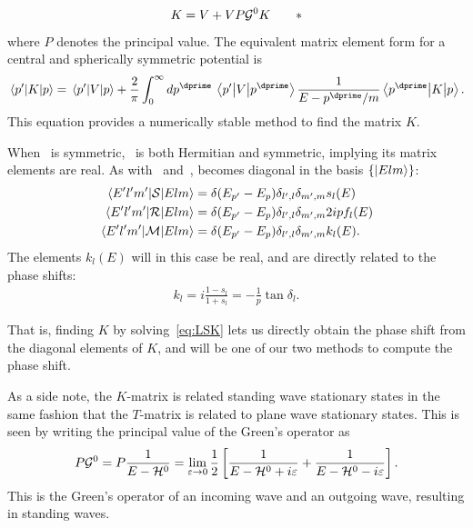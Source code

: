 \begin{equation*}
  K = V + VP\mathcal{G}^{0}K
  \tag*{$*$}
\end{equation*}
where \(P\) denotes the principal value. The equivalent matrix element form for
a central and spherically symmetric potential is\cite{morten}
\begin{equation}
  \label{eq:LSK}
  \mel{p^{\prime}}{K}{p} = \mel{p^{\prime}}{V}{p} + \frac{2}{\pi}\int_{0}^{\infty}dp^{\dprime}\:
  \mel{p^{\prime}}{V}{p^{\dprime}}\frac{1}{E-p^{\dprime}/m} \mel{p^{\dprime}}{K}{p} .
\end{equation}
This equation provides a numerically stable method to find the matrix \(K\).

When\  is symmetric,\  is both Hermitian and
symmetric, implying its matrix elements are real.
As with\  and\ ,  becomes diagonal in the basis
\(\left\{ \ket{Elm} \right\}\):
\begin{align*}
  \mel{E^{\prime}l^{\prime}m^{\prime}}{\mathcal{S}}{Elm} &= \delta(E_{p^{\prime}}-E_{p})\delta_{l^{\prime},l}\delta_{m^{\prime},m}s_{l}(E)\\
  \mel{E^{\prime}l^{\prime}m^{\prime}}{\mathcal{R}}{Elm} &= \delta(E_{p^{\prime}}-E_{p})\delta_{l^{\prime},l}\delta_{m^{\prime},m}2ipf_{l}(E)\\
  \mel{E^{\prime}l^{\prime}m^{\prime}}{\mathcal{M}}{Elm} &= \delta(E_{p^{\prime}}-E_{p})\delta_{l^{\prime},l}\delta_{m^{\prime},m}k_{l}(E).\\
\end{align*}
The elements \(k_{l}(E)\) will in this case be real, and are directly related to
the phase shifts:
\begin{align*}
  k_{l} = i \frac{1-s_{l}}{1+s_{l}} = -\frac{1}{p}\tan\delta_{l}.
  \tag*{$*$}
\end{align*}

That is, finding \(K\) by solving~\eqref{eq:LSK} lets us directly obtain the phase shift from the
diagonal elements of \(K\), and will be one of our two methods to compute the
phase shift.

As a side note, the \(K\)-matrix is related standing wave stationary states in
the same fashion that the \(T\)-matrix is related to plane wave stationary
states. This is seen by writing the principal value of the Green's operator as
\begin{equation*}
  P\mathcal{G}^{0} = P \frac{1}{E-\mathcal{H}^{0}} = \lim_{\varepsilon\to 0}\frac{1}{2}
  \left[ \frac{1}{E-\mathcal{H}^{0}+i\varepsilon} + \frac{1}{E-\mathcal{H}^{0}-i\varepsilon} \right].
\end{equation*}
This is the Green's operator of an incoming wave and an outgoing wave, resulting in
standing waves.

